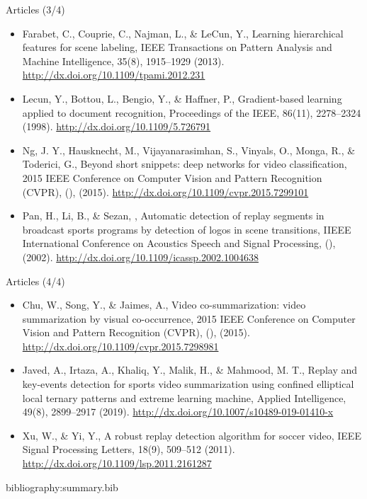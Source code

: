 \documentclass[presentation]{beamer}
\begin{document}
\begin{frame}[label={sec:org36660f4}]{Articles (3/4)}
\begin{itemize}
\item Farabet, C., Couprie, C., Najman, L., \& LeCun, Y., Learning hierarchical features for scene labeling, IEEE Transactions on Pattern Analysis and Machine Intelligence, 35(8), 1915–1929 (2013).  \url{http://dx.doi.org/10.1109/tpami.2012.231}
\item Lecun, Y., Bottou, L., Bengio, Y., \& Haffner, P., Gradient-based learning applied to document recognition, Proceedings of the IEEE, 86(11), 2278–2324 (1998).  \url{http://dx.doi.org/10.1109/5.726791}
\item Ng, J. Y., Hausknecht, M., Vijayanarasimhan, S., Vinyals, O., Monga, R., \& Toderici, G., Beyond short snippets: deep networks for video classification, 2015 IEEE Conference on Computer Vision and Pattern Recognition (CVPR), (),  (2015).  \url{http://dx.doi.org/10.1109/cvpr.2015.7299101}
\item Pan, H., Li, B., \& Sezan, , Automatic detection of replay segments in broadcast sports programs by detection of logos in scene transitions, IIEEE International Conference on Acoustics Speech and Signal Processing, (),  (2002).  \url{http://dx.doi.org/10.1109/icassp.2002.1004638}
\end{itemize}
\end{frame}
\begin{frame}[label={sec:orgdb83796}]{Articles (4/4)}
\begin{itemize}
\item Chu, W., Song, Y., \& Jaimes, A., Video co-summarization: video summarization by visual co-occurrence, 2015 IEEE Conference on Computer Vision and Pattern Recognition (CVPR), (),  (2015).  \url{http://dx.doi.org/10.1109/cvpr.2015.7298981}
\item Javed, A., Irtaza, A., Khaliq, Y., Malik, H., \& Mahmood, M. T., Replay and key-events detection for sports video summarization using confined elliptical local ternary patterns and extreme learning machine, Applied Intelligence, 49(8), 2899–2917 (2019).  \url{http://dx.doi.org/10.1007/s10489-019-01410-x}
\item Xu, W., \& Yi, Y., A robust replay detection algorithm for soccer video, IEEE Signal Processing Letters, 18(9), 509–512 (2011).  \url{http://dx.doi.org/10.1109/lsp.2011.2161287}
\end{itemize}
bibliography:summary.bib
\end{frame}
\end{document}
